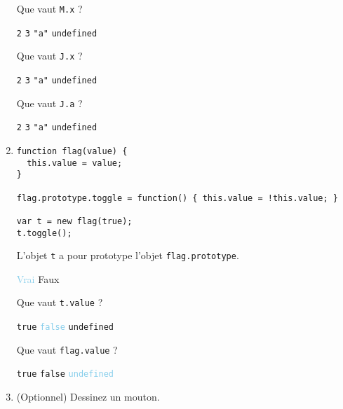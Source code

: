\documentclass[a4paper, 12pt]{article}
\newcommand{\fullpoint}[1]{\textcolor{RubineRed}{#1}}
\newcommand{\halfpoint}[1]{\textcolor{SkyBlue}{#1}}
\newcommand{\choice}[1]{\Square\hspace{2pt} #1\hspace{5pt}}
\newcommand{\choicec}[1]{\Square\hspace{2pt} \lstinline{#1}\hspace{5pt}}
\newcommand{\choicecg}[1]{\fullpoint{\XBox\hspace{2pt} \lstinline{#1}\hspace{5pt}}}
\newcommand{\choicegh}[1]{\halfpoint{\XBox\hspace{2pt} #1\hspace{5pt}}}
\newcommand{\choicecgh}[1]{\halfpoint{\XBox\hspace{2pt} \lstinline{#1}\hspace{5pt}}}
\begin{document}
\begin{enumerate}
  Que vaut \lstinline{M.x} ?

  \choicec{2} \choicecg{3} \choicec{"a"} \choicec{undefined}

  Que vaut \lstinline{J.x} ?

  \choicec{2} \choicecg{3} \choicec{"a"} \choicec{undefined}

  Que vaut \lstinline{J.a} ?

  \choicec{2} \choicec{3} \choicecg{"a"} \choicec{undefined}
\item \lstset{language=javascript}
\begin{lstlisting}
function flag(value) {
  this.value = value;
}

flag.prototype.toggle = function() { this.value = !this.value; }

var t = new flag(true);
t.toggle();
\end{lstlisting}

  L'objet \lstinline{t} a pour prototype l'objet
  \lstinline{flag.prototype}.

  \choicegh{Vrai} \choice{Faux}

  Que vaut \lstinline{t.value} ?

  \choicec{true} \choicecgh{false} \choicec{undefined}

  Que vaut \lstinline{flag.value} ?

  \choicec{true} \choicec{false} \choicecgh{undefined}
\item (Optionnel) Dessinez un mouton.
\end{enumerate}
\end{document}
